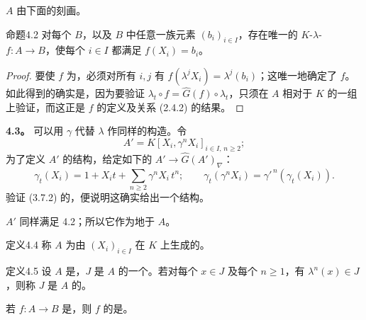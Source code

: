  $A$ 由下面的刻画。
\begin{SGAresult}{命题}{4.2}
对每个 $B$，以及 $B$ 中任意一族元素 $(b_i)_{i\in I}$，存在唯一的 $K$-$\lambda$- $f:A\longrightarrow B$，使每个 $i\in I$ 都满足 $f(X_i)=b_i$。
\end{SGAresult}
\begin{proof}
要使 $f$ 为，必须对所有 $i,j$ 有 $f(\lambda^jX_i)=\lambda^j(b_i)$；这唯一地确定了 $f$。如此得到的确实是，因为要验证 $\lambda_t\circ f=\widehat G(f)\circ\lambda_t$，只须在 $A$ 相对于 $K$ 的一组上验证，而这正是 $f$ 的定义及关系 (2.4.2) 的结果。
\end{proof}

\textbf{4.3。} 可以用 $\gamma$ 代替 $\lambda$ 作同样的构造。令
\[
A'=K[X_i,\gamma^nX_i]_{i\in I,\,n\geqslant2};
\]
为了定义 $A'$ 的结构，给定如下的 $A'\longrightarrow\widehat G(A')_\nabla$：
\[
\gamma_t(X_i)=1+X_it+\sum_{n\geqslant2}\gamma^nX_i\,t^n;
\qquad
\gamma_t(\gamma^nX_i)=\gamma'^{\,n}(\gamma_t(X_i)).
\tag{4.3.1}
\]
验证 (3.7.2) 的，便说明这确实给出一个结构。

 $A'$ 同样满足 4.2；所以它作为地于 $A$。

\begin{SGAresult}{定义}{4.4}
称 $A$ 为由 $(X_i)_{i\in I}$ 在 $K$ 上生成的。
\end{SGAresult}

\begin{SGAresult}{定义}{4.5}
设 $A$ 是，$J$ 是 $A$ 的一个。若对每个 $x\in J$ 及每个 $n\geqslant1$，有 $\lambda^n(x)\in J$，则称 $J$ 是 $A$ 的。
\end{SGAresult}

若 $f:A\longrightarrow B$ 是，则 $f$ 的是。

